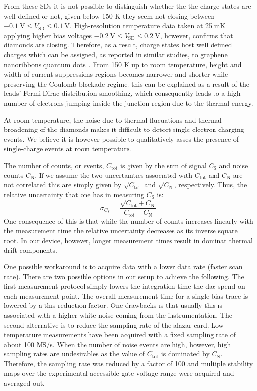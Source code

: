 From these \glspl{SD} it is not possible to distinguish whether the the charge states are well defined or not, given below 150 K they seem not closing between $\SI{-0.1}{\V}\le V_\textrm{SD}\le\SI{+0.1}{\V}$. High-resolution temperature data taken at 25 mK applying higher bias voltages $\SI{-0.2}{\V}\le V_\textrm{SD}\le\SI{+0.2}{\V}$, however, confirms that diamonds are closing. Therefore, as a result, charge states host well defined charges which can be assigned, as reported in similar studies, to graphene nanoribbons quantum dots~\cite{el2020controlled, sols2007coulomb, todd2009quantum}. From 150 K up to room temperature, height and width of current suppressions regions becomes narrower and shorter while preserving the Coulomb blockade regime: this can be explained as a result of the leads' Fermi-Dirac distribution smoothing, which consequently leads to a high number of electrons jumping inside the junction region due to the thermal energy.

At room temperature, the noise due to thermal flucuations and thermal broadening of the diamonds makes it difficult to detect single-electron charging events. We believe it is however possible to qualitatively asses the presence of single-charge events at room temperature.




The number of counts, or events, $C_\text{tot}$ is given by the sum of signal $C_\text{S}$ and noise counts $C_\text{N}$. If we assume the two uncertainties associated with $C_\text{tot}$ and $C_\text{N}$ are not correlated this are simply given by $\sqrt{C_\text{tot}}$ and $\sqrt{C_\text{N}}$, respectively. Thus, the relative uncertainty that one has in measuring $C_\text{S}$ is:
\begin{equation}
  \sigma_{C_\text{S}} = \frac{\sqrt{C_\text{tot}+C_\text{N}}}{C_\text{tot}-C_\text{N}}
\end{equation}
One consequence of this is that while the number of counts increases linearly with the measurement time the relative uncertainty decreases as its inverse square root. In our device, however, longer measurement times result in dominat thermal drift components.

One possible workaround is to acquire data with a lower data rate (faster scan rate). There are two possible options in our setup to achieve the following.
The first measurement protocol simply lowers the integration time the dac spend on each measurement point. The overall measurement time for a single bias trace is lowered by a this reduction factor. One drawbacks is that usually this is associated with a higher white noise coming from the instrumentation. The second alternative is to reduce the sampling rate of the alazar card. Low temperature measurements have been acquired with a fixed sampling rate of about 100 MS/s. When the number of noise events are high, however, high sampling rates are undesirables as the value of $C_\text{tot}$ is dominated by $C_\text{N}$. Therefore, the sampling rate was reduced by a factor of 100 and multiple stability maps over the experimental accessible gate voltage range were acquired and averaged out.

